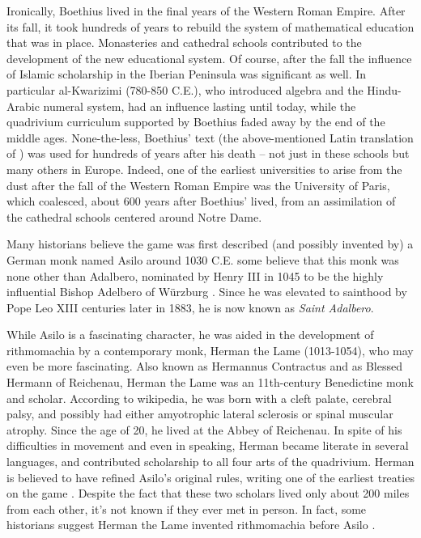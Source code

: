 \documentclass[14pt]{extarticle}
\begin{document}
Ironically, Boethius lived in the final years of the Western Roman Empire.
After its fall, it took hundreds of years to rebuild the
system of mathematical education that was in place.
Monasteries and cathedral schools contributed to the
development of the new educational
system. Of course, after the fall the influence of Islamic scholarship
in the Iberian Peninsula was significant as well. In particular
al-Kwarizimi (780-850 C.E.), who introduced algebra and the Hindu-Arabic
numeral system, had an influence lasting until today,
while the quadrivium curriculum supported by Boethius faded away
by the end of the middle ages.
None-the-less, Boethius' text (the above-mentioned Latin
translation of \cite{Ni00})
was used for hundreds of years after his death -- not just in these
schools but many others in Europe.
Indeed, one of the earliest universities to arise from the dust after the
fall of the Western Roman Empire was the University of Paris, which
coalesced, about 600 years after Boethius' lived,
from an assimilation of the cathedral schools centered around
Notre Dame. 

Many historians believe the game was first described
(and possibly invented by) a German monk named
Asilo around 1030 C.E.
some believe that this monk was none other than Adalbero,
nominated by Henry III in 1045 to be the highly influential
Bishop Adelbero of W\"urzburg \cite{Mo01}.
Since he was elevated to sainthood by Pope Leo XIII
centuries later in 1883, he is now known as {\it Saint Adalbero}.

While Asilo is a fascinating character, he was aided in the
development of rithmomachia by a contemporary monk,
Herman the Lame (1013-1054),
who may even be more fascinating. Also known as
Hermannus Contractus and as Blessed Hermann of Reichenau,
Herman the Lame was an 11th-century Benedictine monk and scholar. 
According to wikipedia, he was born with a cleft palate, cerebral palsy, and
possibly had either amyotrophic lateral sclerosis or spinal
muscular atrophy. Since the age of 20, he lived at the
Abbey of Reichenau. In spite of his difficulties in movement
and even in speaking, Herman became literate in several languages,
and contributed scholarship to all four arts of the quadrivium.
Herman is believed to have refined Asilo's original rules,
writing one of the earliest treaties on the game
\cite{MacT}. Despite the fact that these two scholars lived only
about 200 miles from each other, it's not known if they ever met in person.
In fact, some historians suggest Herman the Lame invented rithmomachia
before Asilo \cite{SE11}.
\end{document}
